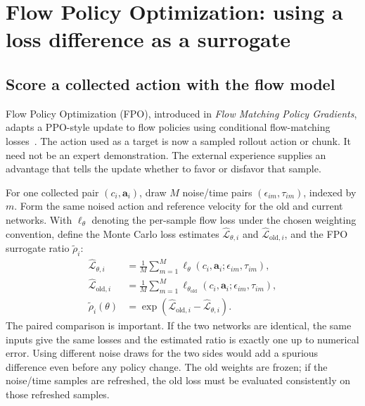 \section{Flow Policy Optimization: using a loss difference as a surrogate}
\label{sec:fpo}



\subsection{Score a collected action with the flow model}
Flow Policy Optimization (FPO), introduced in \emph{Flow Matching Policy Gradients}, adapts a PPO-style update to flow policies using conditional flow-matching losses~\citep{fpo}. The action used as a target is now a sampled rollout action or chunk. It need not be an expert demonstration. The external experience supplies an advantage that tells the update whether to favor or disfavor that sample.

For one collected pair $(c_i,\mathbf a_i)$, draw $M$ noise/time pairs $(\epsilon_{im},\tau_{im})$, indexed by $m$. Form the same noised action and reference velocity for the old and current networks. With $\ell_\theta$ denoting the per-sample flow loss under the chosen weighting convention, define the Monte Carlo loss estimates $\widehat{\mathcal L}_{\theta,i}$ and $\widehat{\mathcal L}_{\mathrm{old},i}$, and the FPO surrogate ratio $\tilde\rho_i$:
\begin{align}
 \widehat{\mathcal L}_{\theta,i}&=\frac1M\sum_{m=1}^M
 \ell_\theta(c_i,\mathbf a_i;\epsilon_{im},\tau_{im}),\nonumber\\
 \widehat{\mathcal L}_{\mathrm{old},i}&=\frac1M\sum_{m=1}^M
 \ell_{\theta_{\mathrm{old}}}(c_i,\mathbf a_i;\epsilon_{im},\tau_{im}),\nonumber\\
 \tilde\rho_i(\theta)
 &=\exp\left(\widehat{\mathcal L}_{\mathrm{old},i}-\widehat{\mathcal L}_{\theta,i}\right).
 \label{eq:fpo-ratio}
\end{align}
The paired comparison is important. If the two networks are identical, the same inputs give the same losses and the estimated ratio is exactly one up to numerical error. Using different noise draws for the two sides would add a spurious difference even before any policy change. The old weights are frozen; if the noise/time samples are refreshed, the old loss must be evaluated consistently on those refreshed samples.

